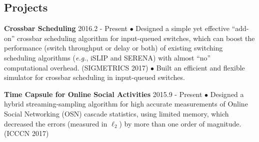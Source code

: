 \documentclass[line,11pt,letter]{C:\Users\lgong\Dropbox\git-reps\easy_cv\includes/cls\myRes}
\begin{document}
\begin{resume}
\section{Projects}
\vspace{-4pt}
{\setlength{\parskip}{0pt}
{\bf Crossbar Scheduling} \hfill 2016.2 - Present\break
{\hspace*{1em} $\bullet$ Designed a simple yet effective ``add-on'' crossbar scheduling algorithm for input-queued switches, which can boost the performance (switch throughput or delay or both) of existing switching scheduling algorithms ({\it e.g.}, iSLIP and SERENA) with almost ``no'' computational overhead. (SIGMETRICS 2017)\hfill\break}
{\hspace*{1em} $\bullet$ Built an efficient and flexible simulator for crossbar scheduling in input-queued switches.\hfill\break}
\sspace

}
{\setlength{\parskip}{0pt}
{\bf Time Capsule for Online Social Activities} \hfill 2015.9 - Present\break
{\hspace*{1em} $\bullet$ Designed a hybrid streaming-sampling algorithm for high accurate measurements of Online Social Networking (OSN) cascade statistics, using limited memory, which decreased the errors (measured in $\ell_2$) by more than one order of magnitude. (ICCCN 2017)\hfill\break}
}
\negspace

\end{resume}
\end{document}
